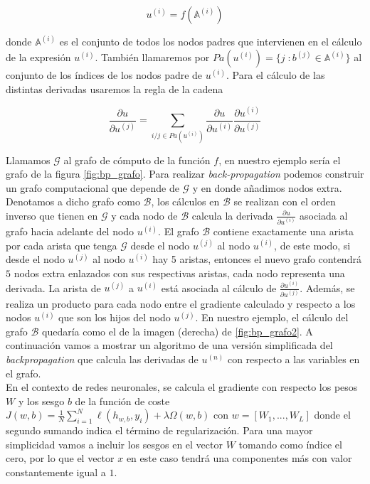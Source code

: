         \begin{equation}
            u^{(i)} = f(\mathbb{A}^{(i)}) 
        \end{equation}

    \noindent donde $\mathbb{A}^{(i)}$ es el conjunto de todos los nodos padres que intervienen en el cálculo de la expresión $u^{(i)}$. También llamaremos por $Pa(u^{(i)}) = \{ j \; : b^{(j)} \in \mathbb{A}^{(i)}\}$ al conjunto de los índices de los nodos padre de $u^{(i)}$. Para el cálculo de las distintas derivadas usaremos la regla de la cadena
        
        \begin{equation}
            \frac{\partial u}{\partial u^{(j)}} = \sum_{i/j \in Pa(u^{(i)})} \frac{\partial u}{\partial u^{(i)}} \frac{\partial u^{(i)}}{\partial u^{(j)}}
        \end{equation}
        
    Llamamos $\mathcal{G}$ al grafo de cómputo de la función $f$, en nuestro ejemplo sería el grafo de la figura \ref{fig:bp_grafo}. Para realizar \textit{back-propagation} podemos construir un grafo computacional que depende de $\mathcal{G}$ y en donde añadimos nodos extra. Denotamos a dicho grafo como $\mathcal{B}$, los cálculos en $\mathcal{B}$ se realizan con el orden inverso que tienen en $\mathcal{G}$ y cada nodo de $\mathcal{B}$ calcula la derivada $\frac{\partial u}{\partial u^{(i)}}$ asociada al grafo hacia adelante del nodo $u^{(i)}$. El grafo $\mathcal{B}$ contiene exactamente una arista por cada arista que tenga $\mathcal{G}$ desde el nodo $u^{(j)}$ al nodo $u^{(i)}$, de este modo, si desde el nodo $u^{(j)}$ al nodo $u^{(i)}$ hay 5 aristas, entonces el nuevo grafo contendrá $5$ nodos extra enlazados con sus respectivas aristas, cada nodo representa una derivada. La arista de $u^{(j)}$ a $u^{(i)}$ está asociada al cálculo de $\frac{\partial u^{(i)}}{\partial u^{(j)}}$. Además, se realiza un producto para cada nodo entre el gradiente calculado y respecto a los nodos $u^{(i)}$ que son los hijos del nodo $u^{(j)}$. En nuestro ejemplo, el cálculo del grafo $\mathcal{B}$ quedaría como el de la imagen (derecha) de \ref{fig:bp_grafo2}. A continuación vamos a mostrar un algoritmo de una versión simplificada del \textit{backpropagation} que calcula las derivadas de $u^{(n)}$ con respecto a las variables en el grafo. \\
    
    En el contexto de redes neuronales, se calcula el gradiente con respecto los pesos $W$ y los sesgo $b$ de la función de coste $J(w,b) = \frac{1}{N} \sum_{i=1}^N \ell(h_{w,b},y_i) + \lambda \Omega(w,b)$ con $w = [W_1,...,W_L]$ donde el segundo sumando indica el término de regularización. Para una mayor simplicidad vamos a incluir los sesgos en el vector $W$ tomando como índice el cero, por lo que el vector $x$ en este caso tendrá una componentes más con valor constantemente igual a $1$. \\
	  
